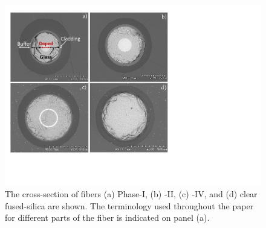 \documentclass[a4paper,11pt]{article}
\begin{document}
\begin{figure}[ht]
\begin{center}\vspace{-1pc}
      \includegraphics[width=10 cm]{Figures/allfiberimage2.pdf}
\caption{\small The cross-section of fibers
{(a)} Phase-I,
{(b)} -II,
{(c)} -IV, and
{(d)} clear fused-silica are shown.  The terminology used throughout the paper for different parts of the fiber is indicated on panel {(a)}.}
    \label{fig:FiberCrossSections}
\end{center}
\end{figure}
\end{document}
